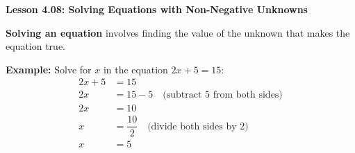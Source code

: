 \begin{center}
\textbf{Lesson 4.08: Solving Equations with Non-Negative Unknowns}
\end{center}

\vspace*{-1.5ex}

\noindent \textbf{Solving an equation} involves finding the value of the unknown that makes the equation true. 

\noindent\textbf{Example:}  
Solve for \(x\) in the equation \(2x + 5 = 15\):
\[
\begin{aligned}
    2x + 5 &= 15 \\
    2x &= 15 - 5 \quad \text{(subtract 5 from both sides)} \\
    2x &= 10 \\
    x &= \dfrac{10}{2} \quad \text{(divide both sides by 2)} \\
    x &= 5
\end{aligned}
\]
